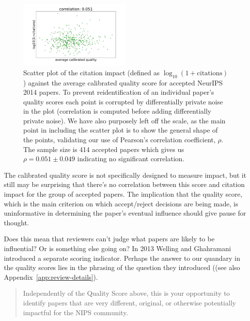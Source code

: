 \documentclass[twoside]{article}
\begin{document}
\begin{figure}[htb]
  \begin{center}
    \includegraphics[width=0.5\textwidth]{diagrams/neurips/citations-vs-average-calibrated-quality-accept.pdf}
  \end{center}
  \caption{Scatter plot of the citation impact (defined as
    $\log_{10}(1+\text{citations})$) against the average calibrated
    quality score for accepted NeurIPS 2014 papers. To prevent
    reidentification of an individual paper's quality scores each
    point is corrupted by differentially private noise in the plot
    (correlation is computed before adding differentially private
    noise). We have also purposely left off the scale, as the main
    point in including the scatter plot is to show the general shape
    of the points, validating our use of Pearson's correlation
    coefficient, $\rho$. The sample size is 414 accepted papers which
    gives us $\rho = 0.051 \pm 0.049$ indicating no significant
    correlation.}
  \label{figure-citations-vs-average-calibrated-quality-accept}
\end{figure}

The calibrated quality score is not specifically designed to measure
impact, but it still may be surprising that there's no correlation
between this score and citation impact for the group of accepted
papers. The implication that the quality score, which is the main
criterion on which accept/reject decisions are being made, is
uninformative in determining the paper's eventual influence should
give pause for thought.

Does this mean that reviewers can't judge what papers are likely to be
influential? Or is something else going on? In 2013 Welling and
Ghahramani introduced a separate scoring indicator. 
Perhaps the answer to our quandary in the quality
scores lies in the phrasing of the question they introduced ((see also
Appendix~\ref{app:review-details}).
\begin{quote}
  Independently of the Quality Score above, this is your opportunity to
identify papers that are very different, original, or otherwise
potentially impactful for the NIPS community.
\end{quote}
\end{document}
